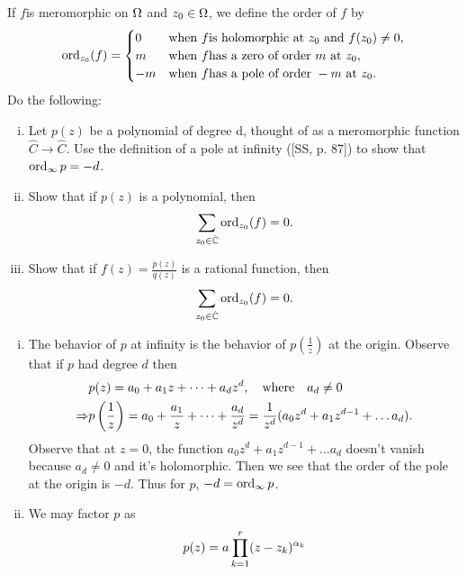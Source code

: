 \documentclass[12pt]{memoir}
\begin{document}
\begin{Ej}
    If $f $is meromorphic on $\Omega$ and $z_0\in\Omega$, we define the order of $f$ by
    $$
    \operatorname{ord}_{z_0}(f)=\begin{cases}
        0&\text{when }f\text{is holomorphic at }z_0\text{ and }f(z_0)\neq 0,\\
        m&\text{when }f\text{has a zero of order }m\text{ at }z_0,\\
        -m&\text{when }f\text{has a pole of order }-m\text{ at }z_0.
    \end{cases}
    $$
    Do the following:
    \begin{enumerate}[i)]
        \itemsep=-0.4em
        \item Let $p(z)$ be a polynomial of degree d, thought of as a meromorphic function $\hat{C}\to\hat{C}$. Use the definition of a pole at infinity ([SS, p. 87]) to show that $\operatorname{ord}_{\infty}p=-d$.
        \item Show that if $p(z)$ is a polynomial, then 
        $$\sum_{z_0\in\hat{\mathbb{C}}}\operatorname{ord}_{z_0}(f)=0.$$
        \item Show that if $f(z)=\frac{p(z)}{q(z)}$ is a rational function, then 
        $$\sum_{z_0\in\hat{\mathbb{C}}}\operatorname{ord}_{z_0}(f)=0.$$
    \end{enumerate}
\end{Ej}

\begin{ptcbr}
    \begin{enumerate}[i)]
        \itemsep=-0.4em
        \item The behavior of $p$ at infinity is the behavior of $p\left(\frac1z\right)$ at the origin. Observe that if $p$ had degree $d$ then 
        \begin{align*}
        &p(z)=a_0+a_1z+\dots+a_dz^d,\quad\text{where}\quad a_d\neq 0\\
            \Rightarrow &p\left(\frac1z\right)=a_0+\frac{a_1}{z}+\dots+\frac{a_d}{z^d}=\frac{1}{z^d}(a_0z^d+a_1z^{d-1}+\dots a_d).
        \end{align*}
        Observe that at $z=0$, the function $a_0z^d+a_1z^{d-1}+\dots a_d$ doesn't vanish because $a_d\neq 0$ and it's holomorphic. Then we see that the order of the pole at the origin is $-d$. Thus for $p$, $-d=\operatorname{ord}_{\infty}p$.
        \item We may factor $p$ as 
         $$p(z)=a\prod_{k=1}^{r}(z-z_k)^{\alpha_k}$$
    \end{enumerate}
\end{ptcbr}
\end{document}
